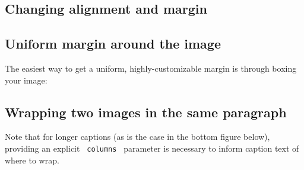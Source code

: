 
\subsection{Changing alignment and
margin}\label{changing-alignment-and-margin}

\begin{Shaded}
\begin{Highlighting}[]
\NormalTok{)}
\end{Highlighting}
\end{Shaded}


\subsection{Uniform margin around the
image}\label{uniform-margin-around-the-image}

The easiest way to get a uniform, highly-customizable margin is through
boxing your image:

\begin{Shaded}
\begin{Highlighting}[]
\NormalTok{\#wrap{-}content(boxed)[}
\NormalTok{]}
\end{Highlighting}
\end{Shaded}


\subsection{Wrapping two images in the same
paragraph}\label{wrapping-two-images-in-the-same-paragraph}

Note that for longer captions (as is the case in the bottom figure
below), providing an explicit \texttt{\ columns\ } parameter is
necessary to inform caption text of where to wrap.

\begin{Shaded}
\begin{Highlighting}[]
\NormalTok{)}
\NormalTok{)}
\end{Highlighting}
\end{Shaded}

